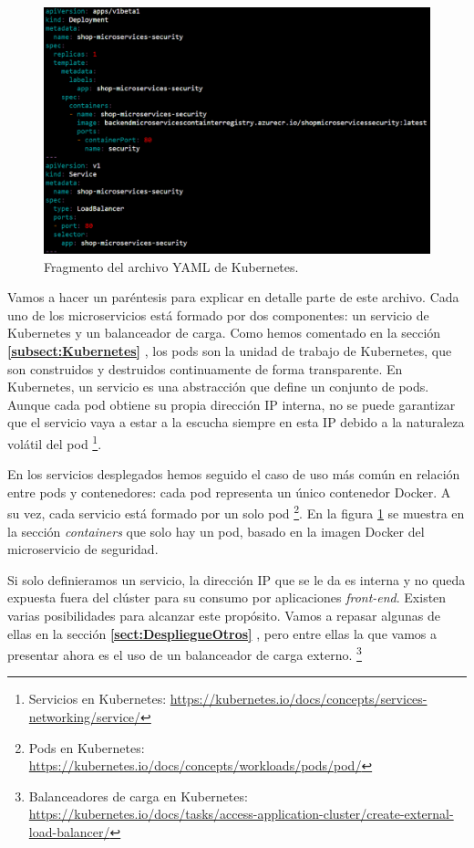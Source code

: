 \documentclass[11pt,spanish,listoffigures]{tfgetsinf}
\begin{document}
\begin{figure}[h]
\centering
\includegraphics[scale=0.6]{KubernetesSecurity}
\caption{Fragmento del archivo YAML de Kubernetes.}
\label{fig:KubernetesSecurity}
\end{figure}

Vamos a hacer un paréntesis para explicar en detalle parte de este archivo. Cada uno de los microservicios está formado por dos componentes: un servicio de Kubernetes y un balanceador de carga. Como hemos comentado en la sección \textbf{\ref{subsect:Kubernetes} }, los pods son la unidad de trabajo de Kubernetes, que son construidos y destruidos continuamente de forma transparente. En Kubernetes, un servicio es una abstracción que define un conjunto de pods. Aunque cada pod obtiene su propia dirección IP interna, no se puede garantizar que el servicio vaya a estar a la escucha siempre en esta IP debido a la naturaleza volátil del pod \footnote{ Servicios en Kubernetes: \url{https://kubernetes.io/docs/concepts/services-networking/service/}}.

En los servicios desplegados hemos seguido el caso de uso más común en relación entre pods y contenedores: cada pod representa un único contenedor Docker. A su vez, cada servicio está formado por un solo pod \footnote{ Pods en Kubernetes: \url{https://kubernetes.io/docs/concepts/workloads/pods/pod/}}. En la figura \ref{fig:KubernetesSecurity} se muestra en la sección \textit{containers} que solo hay un pod, basado en la imagen Docker del microservicio de seguridad.

Si solo definieramos un servicio, la dirección IP que se le da es interna y no queda expuesta fuera del clúster para su consumo por aplicaciones \textit{front-end}. Existen varias posibilidades para alcanzar este propósito. Vamos a repasar algunas de ellas en la sección \textbf{\ref{sect:DespliegueOtros} }, pero entre ellas la que vamos a presentar ahora es el uso de un balanceador de carga externo. \footnote{ Balanceadores de carga en Kubernetes: \url{https://kubernetes.io/docs/tasks/access-application-cluster/create-external-load-balancer/}} 
\end{document}
